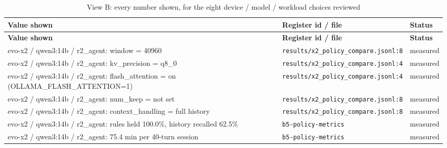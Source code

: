 \begin{longtable}{>{\raggedright\arraybackslash}p{}>{\raggedright\arraybackslash}p{}>{\raggedright\arraybackslash}p{}}
\caption{View B: every number shown, for the eight device / model / workload choices reviewed}\label{tab:b}\\
\toprule
\textbf{Value shown} & \textbf{Register id / file} & \textbf{Status} \\
\midrule
\endfirsthead
\toprule
\textbf{Value shown} & \textbf{Register id / file} & \textbf{Status} \\
\midrule
\endhead
\small evo-x2 / qwen3:14b / r2\_agent: window = 40960 & {\footnotesize \texttt{results/\allowbreak{}x2\_\allowbreak{}policy\_\allowbreak{}compare.\allowbreak{}jsonl:\allowbreak{}8}} & \small measured \\

\small evo-x2 / qwen3:14b / r2\_agent: kv\_precision = q8\_0 & {\footnotesize \texttt{results/\allowbreak{}x2\_\allowbreak{}policy\_\allowbreak{}compare.\allowbreak{}jsonl:\allowbreak{}4}} & \small measured \\

\small evo-x2 / qwen3:14b / r2\_agent: flash\_attention = on (OLLAMA\_FLASH\_ATTENTION=1) & {\footnotesize \texttt{results/\allowbreak{}x2\_\allowbreak{}policy\_\allowbreak{}compare.\allowbreak{}jsonl:\allowbreak{}4}} & \small measured \\

\small evo-x2 / qwen3:14b / r2\_agent: num\_keep = not set & {\footnotesize \texttt{results/\allowbreak{}x2\_\allowbreak{}policy\_\allowbreak{}compare.\allowbreak{}jsonl:\allowbreak{}8}} & \small measured \\

\small evo-x2 / qwen3:14b / r2\_agent: context\_handling = full history & {\footnotesize \texttt{results/\allowbreak{}x2\_\allowbreak{}policy\_\allowbreak{}compare.\allowbreak{}jsonl:\allowbreak{}8}} & \small measured \\

\small evo-x2 / qwen3:14b / r2\_agent: rules held 100.0\%, history recalled 62.5\% & {\footnotesize \texttt{b5-\allowbreak{}policy-\allowbreak{}metrics}} & \small measured \\

\small evo-x2 / qwen3:14b / r2\_agent: 75.4 min per 40-turn session & {\footnotesize \texttt{b5-\allowbreak{}policy-\allowbreak{}metrics}} & \small measured \\


\end{longtable}
